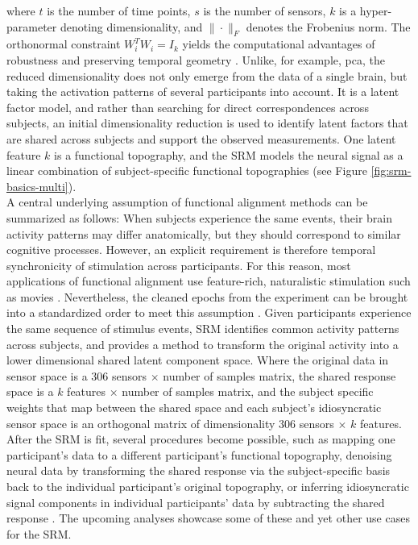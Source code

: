 where $t$ is the number of time points, $s$ is the number of sensors, $k$ is a hyper-parameter denoting dimensionality, and $\|\cdot\|_F$ denotes the Frobenius norm.
The orthonormal constraint $W^T_iW_i = I_k$ yields the computational advantages of robustness and preserving temporal geometry \citep{NIPS2015_b3967a0e}.
Unlike, for example, \gls{pca}, the reduced dimensionality does not only emerge from the data of a single brain, but taking the activation patterns of several participants into account.
It is a latent factor model, and rather than searching for direct correspondences across subjects, an initial dimensionality reduction is used to identify latent factors that are shared across subjects and support the observed measurements.
One latent feature $k$ is a functional topography, and the \gls{SRM} models the neural signal as a linear combination of subject-specific functional topographies (see Figure \ref{fig:srm-basics-multi}).\\
A central underlying assumption of functional alignment methods can be summarized as follows: When subjects experience the same events, their brain activity patterns may differ anatomically, but they should correspond to similar cognitive processes.
However, an explicit requirement is therefore temporal synchronicity of stimulation across participants.
For this reason, most applications of functional alignment use feature-rich, naturalistic stimulation such as movies \citep{haxby2020hyperalignment,bazeille2021empirical}.
Nevertheless, the cleaned epochs from the experiment can be brought into a standardized order to meet this assumption \citep{chentutorial}.
Given participants experience the same sequence of stimulus events, \gls{SRM} identifies common activity patterns across subjects, and provides a method to transform the original activity into a lower dimensional shared latent component space.
Where the original data in sensor space is a $306$ sensors $\times$ number of samples matrix, the shared response space is a $k$ features $\times$ number of samples matrix, and the subject specific weights that map between the shared space and each subject's idiosyncratic sensor space is an orthogonal matrix of dimensionality $306$ sensors $\times$ $k$ features.
After the \gls{SRM} is fit, several procedures become possible, such as mapping one participant's data to a different participant's functional topography, denoising neural data by transforming the shared response via the subject-specific basis back to the individual participant's original topography, or inferring idiosyncratic signal components in individual participants' data by subtracting the shared response \citep{NIPS2015_b3967a0e}.
The upcoming analyses showcase some of these and yet other use cases for the \gls{SRM}.\\


